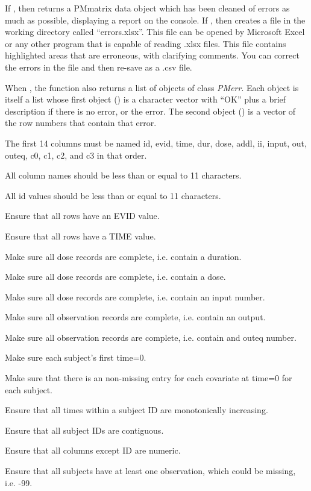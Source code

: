 \documentclass[a4paper]{book}
\begin{document}
\begin{Value}
If , then  returns a PMmatrix data object which has been
cleaned of errors as much as possible, displaying a report on the console.  
If , then  creates a file in the working directory called ``errors.xlsx''.
This file can be opened by Microsoft Excel or any other program that is capable of reading .xlsx files.  This file
contains highlighted areas that are erroneous, with clarifying comments.  You can correct the errors in the file
and then re-save as a .csv file.

When , the function also returns a list of objects of class \emph{PMerr}.  Each object is itself a list whose 
first object () is a character vector with ``OK'' plus a brief description if there is no error, or the error.  
The second object () is a vector of the row numbers that contain that error.
\begin{ldescription}
\item[\code{colorder}] The first 14 columns must be named id, evid, time, dur, dose, addl, ii, input, out, outeq, c0, c1, c2, and c3 in that order.
\item[\code{maxcharCol}] All column names should be less than or equal to 11 characters.
\item[\code{maxcharID}] All id values should be less than or equal to 11 characters.
\item[\code{missEVID}] Ensure that all rows have an EVID value.
\item[\code{missTIME}] Ensure that all rows have a TIME value.
\item[\code{doseDur}] Make sure all dose records are complete, i.e. contain a duration.
\item[\code{doseDose}] Make sure all dose records are complete, i.e. contain a dose.
\item[\code{doseInput}] Make sure all dose records are complete, i.e. contain an input number.
\item[\code{obsOut}] Make sure all observation records are complete, i.e. contain an output.
\item[\code{obsOuteq}] Make sure all observation records are complete, i.e. contain and outeq number.
\item[\code{T0}] Make sure each subject's first time=0.
\item[\code{covT0}] Make sure that there is an non-missing entry for each covariate at time=0 for each subject.
\item[\code{timeOrder}] Ensure that all times within a subject ID are monotonically increasing.
\item[\code{contigID}] Ensure that all subject IDs are contiguous.
\item[\code{nonNum}] Ensure that all columns except ID are numeric.
\item[\code{noObs}] Ensure that all subjects have at least one observation, which could be missing, i.e. -99.
\end{ldescription}
\end{Value}
\end{document}
